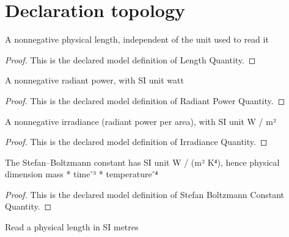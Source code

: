 \section{Declaration topology}
\begin{definition}
  \label{def:physics:phyx-mini-0489:phyxminiproblems-problemphyxmini0489-lengthquantity}
  A nonnegative physical length, independent of the unit used to read it
\end{definition}
\begin{proof}
  This is the declared model definition of Length Quantity.
\end{proof}
\begin{definition}
  \label{def:physics:phyx-mini-0489:phyxminiproblems-problemphyxmini0489-radiantpowerquantity}
  A nonnegative radiant power, with SI unit watt
\end{definition}
\begin{proof}
  This is the declared model definition of Radiant Power Quantity.
\end{proof}
\begin{definition}
  \label{def:physics:phyx-mini-0489:phyxminiproblems-problemphyxmini0489-irradiancequantity}
  A nonnegative irradiance (radiant power per area), with SI unit W / m²
\end{definition}
\begin{proof}
  This is the declared model definition of Irradiance Quantity.
\end{proof}
\begin{definition}
  \label{def:physics:phyx-mini-0489:phyxminiproblems-problemphyxmini0489-stefanboltzmannconstantquantity}
  The Stefan--Boltzmann constant has SI unit W / (m² K⁴), hence physical dimension mass * time⁻³ * temperature⁻⁴
\end{definition}
\begin{proof}
  This is the declared model definition of Stefan Boltzmann Constant Quantity.
\end{proof}
\begin{definition}
  \label{def:physics:phyx-mini-0489:phyxminiproblems-problemphyxmini0489-lengthinmeters}
  Read a physical length in SI metres
\end{definition}

